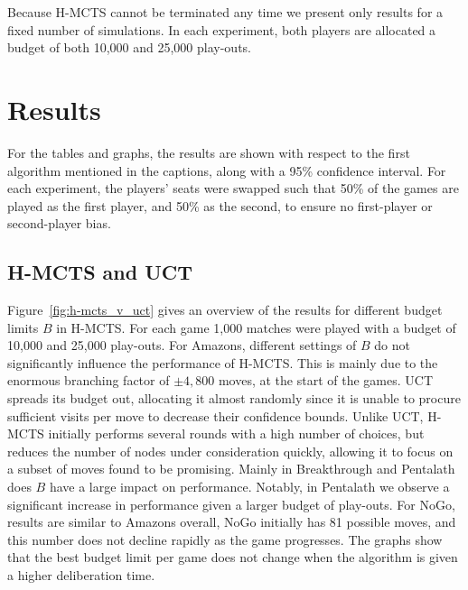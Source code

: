 \documentclass{kecsmstr}
\begin{document}
Because H-MCTS cannot be terminated any time we present only results for a fixed number of simulations. In each experiment, both players are allocated a budget of both 10,000 and 25,000 play-outs.
\newpage
\section{Results}
\label{sec:results}
For the tables and graphs, the results are shown with respect to the first algorithm mentioned in the captions, along with a 95\% confidence interval. For each experiment, the players' seats were swapped such that 50\% of the games are played as the first player, and 50\% as the second, to ensure no first-player or second-player bias. 

\subsection{H-MCTS and UCT}



Figure~\ref{fig:h-mcts_v_uct} gives an overview of the results for different budget limits $B$ in H-MCTS. For each game 1,000 matches were played with a budget of 10,000 and 25,000 play-outs. For Amazons, different settings of $B$ do not significantly influence the performance of H-MCTS. This is mainly due to the enormous branching factor of $\pm 4,800$ moves, at the start of the games. UCT spreads its budget out, allocating it almost randomly since it is unable to procure sufficient visits per move to decrease their confidence bounds. Unlike UCT, H-MCTS initially performs several rounds with a high number of choices, but reduces the number of nodes under consideration quickly, allowing it to focus on a subset of moves found to be promising. Mainly in Breakthrough and Pentalath does $B$ have a large impact on performance. Notably, in Pentalath we observe a significant increase in performance given a larger budget of play-outs. For NoGo, results are similar to Amazons overall, NoGo initially has 81 possible moves, and this number does not decline rapidly as the game progresses. The graphs show that the best budget limit per game does not change when the algorithm is given a higher deliberation time.

% 

\end{document}
